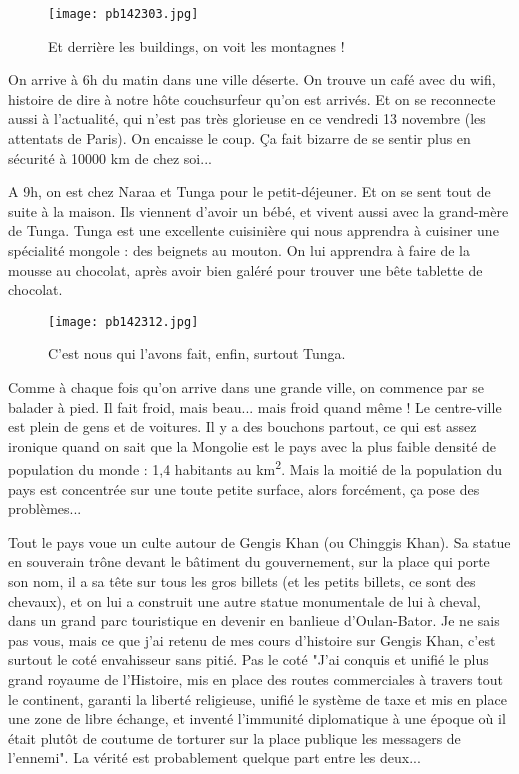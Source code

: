 \documentclass{book}
\begin{document}
\begin{figure}[h]
\centering
\texttt{[image: pb142303.jpg]}
\caption*{ Et derrière les buildings, on voit les montagnes !}
\end{figure}

On arrive à 6h du matin dans une ville déserte. On trouve un café avec du wifi, histoire de dire à notre hôte couchsurfeur qu'on est arrivés. Et on se reconnecte aussi à l'actualité, qui n'est pas très glorieuse en ce vendredi 13 novembre (les attentats de Paris). On encaisse le coup. Ça fait bizarre de se sentir plus en sécurité à 10000 km de chez soi...

A 9h, on est chez Naraa et Tunga pour le petit-déjeuner. Et on se sent tout de suite à la maison. Ils viennent d'avoir un bébé, et vivent aussi avec la grand-mère de Tunga. Tunga est une excellente cuisinière qui nous apprendra à cuisiner une spécialité mongole : des beignets au mouton. On lui apprendra à faire de la mousse au chocolat, après avoir bien galéré pour trouver une bête tablette de chocolat.


\begin{figure}[h]
\centering
\texttt{[image: pb142312.jpg]}
\caption*{ C'est nous qui l'avons fait, enfin, surtout Tunga.}
\end{figure}

Comme à chaque fois qu'on arrive dans une grande ville, on commence par se balader à pied. Il fait froid, mais beau... mais froid quand même ! Le centre-ville est plein de gens et de voitures. Il y a des bouchons partout, ce qui est assez ironique quand on sait que la Mongolie est le pays avec la plus faible densité de population du monde : 1,4 habitants au km\textsuperscript{2}. Mais la moitié de la population du pays est concentrée sur une toute petite surface, alors forcément, ça pose des problèmes...

Tout le pays voue un culte autour de Gengis Khan (ou Chinggis Khan). Sa statue en souverain trône devant le bâtiment du gouvernement, sur la place qui porte son nom, il a sa tête sur tous les gros billets (et les petits billets, ce sont des chevaux), et on lui a construit une autre statue monumentale de lui à cheval, dans un grand parc touristique en devenir en banlieue d'Oulan-Bator. Je ne sais pas vous, mais ce que j'ai retenu de mes cours d'histoire sur Gengis Khan, c'est surtout le coté envahisseur sans pitié. Pas le coté "J'ai conquis et unifié le plus grand royaume de l'Histoire, mis en place des routes commerciales à travers tout le continent, garanti la liberté religieuse, unifié le système de taxe et mis en place une zone de libre échange, et inventé l'immunité diplomatique à une époque où il était plutôt de coutume de torturer sur la place publique les messagers de l'ennemi". La vérité est probablement quelque part entre les deux...
\end{document}
